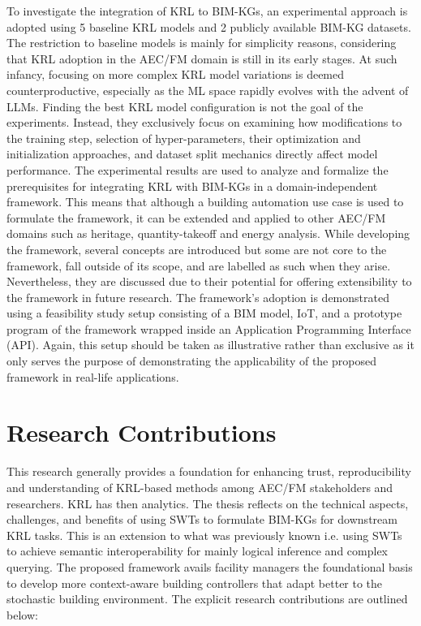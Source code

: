 To investigate the integration of \ac{KRL} to \acp{BIM-KG}, an experimental approach is adopted using 5 baseline \ac{KRL} models and 2 publicly available \ac{BIM-KG} datasets. The restriction to baseline models is mainly for simplicity reasons, considering that \ac{KRL} adoption in the \ac{AEC/FM} domain is still in its early stages. At such infancy, focusing on more complex \ac{KRL} model variations is deemed counterproductive, especially as the \ac{ML} space rapidly evolves with the advent of \acp{LLM}. Finding the best \ac{KRL} model configuration is not the goal of the experiments. Instead, they exclusively focus on examining how modifications to the training step, selection of hyper-parameters, their optimization and initialization approaches, and dataset split mechanics directly affect model performance. The experimental results are used to analyze and formalize the prerequisites for integrating \ac{KRL} with \acp{BIM-KG} in a domain-independent framework. This means that
although a building automation use case is used to formulate the framework, it can be extended and applied to other \ac{AEC/FM} domains such as heritage, quantity-takeoff and energy analysis. While developing the framework, several concepts are introduced but some are not core to the framework, fall outside of its scope, and are labelled as such when they arise. Nevertheless, they are discussed due to their potential for offering extensibility to the framework in future research. The framework's adoption is demonstrated using a feasibility study setup consisting of a \ac{BIM} model, \ac{IoT}, and a prototype program of the framework wrapped inside an Application Programming Interface (API). Again, this setup should be taken as illustrative rather than exclusive as it only serves the purpose of demonstrating the applicability of the proposed framework in real-life applications.

\section{Research Contributions}
This research generally provides a foundation for enhancing trust, reproducibility and understanding of \ac{KRL}-based methods
among AEC/FM stakeholders and researchers. \ac{KRL} has then analytics. The thesis reflects on the technical aspects, challenges, and benefits of using \acp{SWT} to formulate \acp{BIM-KG} for downstream \ac{KRL} tasks. This is an extension to what was previously known i.e. using \acp{SWT} to achieve semantic interoperability for mainly logical inference and complex querying. The proposed framework avails facility managers the foundational basis to develop more context-aware building controllers that adapt better to the stochastic building environment. The explicit research contributions are outlined below:\\

